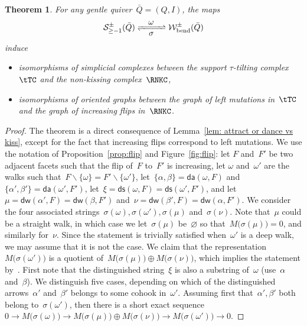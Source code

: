 \documentclass{amsart}
\newtheorem{theorem}{Theorem}[part]
\theoremstyle{definition}
\newcommand{\ssm}{\smallsetminus} %
\newcommand{\strings}{\mathcal{S}} %
\newcommand{\bendingWalks}{\mathcal{W}_\mathrm{bend}} %
\newcommand{\distinguishedWalk}[2]{\mathsf{dw}(#1,#2)} %
\newcommand{\distinguishedArrows}[2]{\mathsf{da}(#1,#2)} %
\newcommand{\distinguishedString}[2]{\mathsf{ds}(#1,#2)} %
\begin{document}
\begin{theorem}
\label{thm:nkc/sttiltc}
For any gentle quiver~$\bar Q = (Q,I)$, the maps
\[
\strings_{\ge-1}^\pm(\bar Q) \xrightleftharpoons[\quad\mbox{$\sigma$}\;\quad]{\mbox{$\omega$}} \bendingWalks^\pm(\bar Q)
\]
induce
\begin{itemize}
\item isomorphisms of simplicial complexes between the support $\tau$-tilting complex~$\tTC$ and the non-kissing complex~$\RNKC$,
\item isomorphisms of oriented graphs between the graph of left mutations in~$\tTC$ and the graph of increasing flips in~$\RNKC$.
\end{itemize}
\end{theorem}


\begin{proof}
The theorem is a direct consequence of Lemma~\ref{lem: attract or dance vs kiss}, except for the fact that increasing flips correspond to left mutations.
We use the notation of Proposition~\ref{prop:flip} and Figure~\ref{fig:flip}: let $F$ and~$F'$ be two adjacent facets such that the flip of~$F$ to~$F'$ is increasing, let $\omega$ and~$\omega'$ are the walks such that~$F \ssm \{\omega\} = F' \ssm \{\omega'\}$, let~$\{\alpha, \beta\} = \distinguishedArrows{\omega}{F}$ and~$\{\alpha', \beta'\} = \distinguishedArrows{\omega'}{F'}$, let~$\xi = \distinguishedString{\omega}{F} = \distinguishedString{\omega'}{F'}$, and let~$\mu = \distinguishedWalk{\alpha'}{F} = \distinguishedWalk{\beta}{F'}$ and~$\nu = \distinguishedWalk{\beta'}{F} = \distinguishedWalk{\alpha}{F'}$.
We consider the four associated strings~$\sigma(\omega), \sigma(\omega'), \sigma(\mu)$ and~$\sigma(\nu)$.
Note that~$\mu$ could be a straight walk, in which case we let~$\sigma(\mu)$ be~$\varnothing$ so that~$M \big( \sigma(\mu) \big) = 0$, and similarly for~$\nu$.
Since the statement is trivially satisfied when~$\omega'$ is a deep walk, we may assume that it is not the case.
We claim that the representation~$M \big( \sigma(\omega') \big)$ is a quotient of~$M \big( \sigma(\mu) \big) \oplus M \big( \sigma(\nu) \big)$, which implies the statement by~\cite[Def.--Prop.~2.28]{AdachiIyamaReiten}.
First note that the distinguished string~$\xi$ is also a substring of~$\omega$ (use~$\alpha$ and~$\beta$).
We distinguish five cases, depending on which of the distinguished arrows~$\alpha'$ and~$\beta'$ belongs to some cohook in~$\omega'$.
Assuming first that~$\alpha', \beta'$ both belong to~$\sigma(\omega')$, then there is a short exact sequence~$0\rightarrow M \big( \sigma(\omega) \big) \rightarrow M \big( \sigma(\mu) \big) \oplus M \big( \sigma(\nu) \big) \rightarrow M \big( \sigma(\omega') \big) \rightarrow 0$.

\end{proof}
\end{document}
